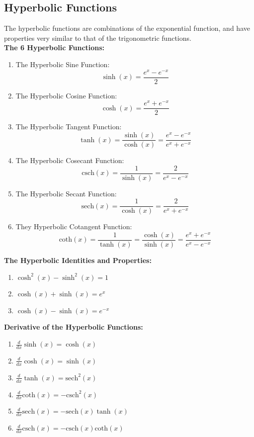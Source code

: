 \documentclass[14pt]{article}
\begin{document}
    \subsection{Hyperbolic Functions}
    The hyperbolic functions are combinations of the exponential function, and have properties very similar to that of the trigonometric functions.\\
    \textbf{The 6 Hyperbolic Functions:}\\
    \begin{enumerate}
        \item The Hyperbolic Sine Function: $$\sinh(x)=\frac{e^x-e^{-x}}{2}$$
        \item The Hyperbolic Cosine Function: $$\cosh(x)=\frac{e^x+e^{-x}}{2}$$
        \item The Hyperbolic Tangent Function: $$\tanh(x)=\frac{\sinh(x)}{\cosh(x)}=\frac{e^x-e^{-x}}{e^x+e^{-x}}$$
        \item The Hyperbolic Cosecant Function: $$\mathrm{csch}(x)=\frac{1}{\sinh(x)}=\frac{2}{e^x-e^{-x}}$$
        \item The Hyperbolic Secant Function: $$\mathrm{sech}(x)=\frac{1}{\cosh(x)}=\frac{2}{e^x+e^{-x}}$$
        \item They Hyperbolic Cotangent Function: $$\mathrm{coth}(x)=\frac{1}{\tanh(x)}=\frac{\cosh(x)}{\sinh(x)}=\frac{e^x+e^{-x}}{e^x-e^{-x}}$$
    \end{enumerate}
    \textbf{The Hyperbolic Identities and Properties:}
    \begin{enumerate}
        \item $\cosh^2(x)-\sinh^2(x)=1$
        \item $\cosh(x)+\sinh(x)=e^x$
        \item $\cosh(x)-\sinh(x)=e^{-x}$
    \end{enumerate}
    \textbf{Derivative of the Hyperbolic Functions:}\\
    \begin{enumerate}
        \item $\frac{d}{dx} \sinh(x)=\cosh(x)$
        \item $\frac{d}{dx} \cosh(x)=\sinh(x)$
        \item $\frac{d}{dx} \tanh(x)=\mathrm{sech}^2(x)$
        \item $\frac{d}{dx} \mathrm{coth}(x)=-\mathrm{csch}^2(x)$
        \item $\frac{d}{dx} \mathrm{sech}(x)=-\mathrm{sech}(x)\tanh(x)$
        \item $\frac{d}{dx} \mathrm{csch}(x)=-\mathrm{csch}(x)\mathrm{coth}(x)$
    \end{enumerate}
\end{document}
